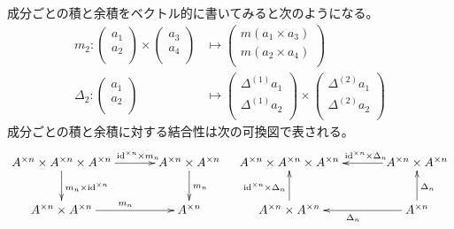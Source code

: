 	成分ごとの積と余積をベクトル的に書いてみると次のようになる。
	\begin{equation*}\begin{split} %
		m_2: \begin{pmatrix}
			a_1 \\
			a_2 \\
		\end{pmatrix}\times \begin{pmatrix}
			a_3 \\
			a_4 \\
		\end{pmatrix} &\mapsto \begin{pmatrix}
			m(a_1\times a_3) \\
			m(a_2\times a_4) \\
		\end{pmatrix} \\
		\Delta_2: \begin{pmatrix}
			a_1 \\
			a_2 \\
		\end{pmatrix} &\mapsto \begin{pmatrix}
			\Delta^{(1)} a_1 \\
			\Delta^{(1)} a_2 \\
		\end{pmatrix} \times \begin{pmatrix}
			\Delta^{(2)} a_1 \\
			\Delta^{(2)} a_2 \\
		\end{pmatrix}
	\end{split}\end{equation*} %
	成分ごとの積と余積に対する結合性は次の可換図で表される。
	\begin{equation}\xymatrix@C+2ex{
		A^{\times n}\times A^{\times n}\times A^{\times n} \ar[d]^{m_n\times \myid^{\times n}} \ar[r]^(.6){\myid^{\times n}\times m_n} 
		& A^{\times n}\times A^{\times n} \ar[d]^{m_n} \\
		A^{\times n}\times A^{\times n} \ar[r]^{m_n} & A^{\times n} \\
	} \quad \xymatrix@C+2ex{
		A^{\times n}\times A^{\times n}\times A^{\times n}   
		& A^{\times n}\times A^{\times n} \ar[l]_(.4){\myid^{\times n}\times \Delta_n} \\
		A^{\times n}\times A^{\times n} \ar[u]^{\myid^{\times n}\times \Delta_n} 
		& A^{\times n} \ar[l]^{\Delta_n} \ar[u]_{\Delta_n} \\
	}\end{equation}

